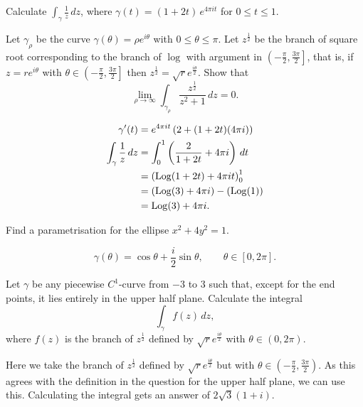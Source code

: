 \question Calculate $\int_\gamma \frac1z \,dz$, where 
$\gamma(t) = (1+2t)\,e^{4\pi it}$ for $0 \leq t \leq 1$.

\question Let $\gamma_\rho$ be the curve $\gamma(\theta) = \rho e^{i\theta}$
with $0 \leq \theta \leq \pi$.
Let $z^{\frac12}$ be the branch of square root corresponding to the branch
of $\log$ with argument in $\left(-\frac{\pi}2, \frac{3\pi}2\right]$,
that is, if $z = re^{i\theta}$ with
$\theta \in \left(-\frac{\pi}2, \frac{3\pi}2\right]$
then 
$z^{\frac12} = \sqrt r e^{\frac{i\theta}2}$.
Show that
\[
    \lim_{\rho \to \infty} \int_{\gamma_\rho} \frac{z^{\frac12}}{z^2 + 1} \,dz = 0.
\]
\begin{solution}
    \begin{align*}
        \gamma'(t) &= e^{4\pi i t} \left(2 + (1+2t)(4\pi i)\right) \\
        \int_\gamma \frac1z \,dz
        &= \int_0^1 \left(\frac2{1+2t} + 4\pi i\right) \,dt \\
        &= \left(\operatorname{Log}(1+2t) + 4\pi i t\right)^1_0 \\
        &= \left(\operatorname{Log}(3) + 4\pi i\right) - \left(\operatorname{Log}(1)\right) \\
        &= \operatorname{Log}(3) + 4\pi i.
    \end{align*}
\end{solution}

\question Find a parametrisation for the ellipse $x^2 + 4y^2 = 1$.
\begin{solution}
    \[
        \gamma(\theta) = \cos\theta + \frac i2 \sin\theta, \qquad \theta \in [0,2\pi].
    \]
\end{solution}

\question Let $\gamma$ be any piecewise $C^1$-curve from $-3$ to $3$ such that, 
except for the end points, it lies entirely in the upper half plane.
Calculate the integral
\[
    \int_\gamma f(z) \,dz,
\]
where $f(z)$ is the branch of $z^{\frac12}$ defined by $\sqrt r e^{\frac{i\theta}2}$
with $\theta \in (0, 2\pi)$.
\begin{solution}
    Here we take the branch of $z^{\frac12}$ defined by $\sqrt r e^{\frac{i\theta}2}$
    but with $\theta \in \left(-\frac\pi2, \frac{3\pi}2\right)$. As
    this agrees with the definition in the question for the upper half plane,
    we can use this.
    Calculating the integral gets an answer of $2\sqrt 3(1+i)$.
\end{solution}

